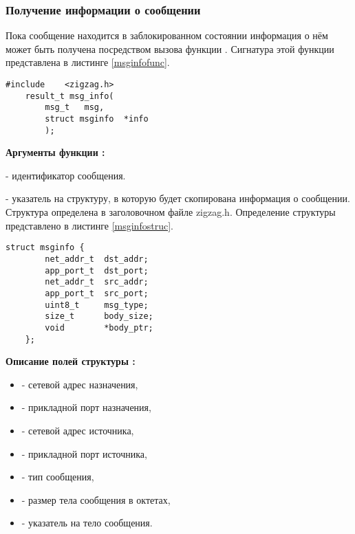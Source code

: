 \subsubsection{Получение информации о сообщении}

Пока сообщение находится в заблокированном состоянии информация о нём может быть получена посредством
вызова функции . Сигнатура этой функции представлена в листинге \ref{msginfofunc}.

\begin{lstlisting}[caption=Функция \myfunc{msg\_info()} - информация о сообщении, label=msginfofunc ]
    #include    <zigzag.h>
    result_t msg_info(
        msg_t   msg,  
        struct msginfo  *info
        );
\end{lstlisting}

{\bfseries Аргументы функции :}

\begin{enumerate}
{\itshape
\item {} - идентификатор сообщения.
\item {} - указатель на структуру, в которую будет скопирована информация о сообщении. Структура
определена в заголовочном файле zigzag.h. Определение структуры представлено в листинге \ref{msginfostruc}.
}

\begin{lstlisting}[caption=Определение структуры \myarg{msginfo}., label=msginfostruc ]
    struct msginfo {
        net_addr_t  dst_addr;
        app_port_t  dst_port;
        net_addr_t  src_addr;
        app_port_t  src_port;
        uint8_t     msg_type;
        size_t      body_size;
        void        *body_ptr;
    };
\end{lstlisting}

{\bfseries Описание полей структуры :}

{\itshape
\begin{itemize}
\item {} - сетевой адрес назначения,
\item {} - прикладной порт назначения,
\item {} - сетевой адрес источника,
\item {} - прикладной порт источника,
\item {} - тип сообщения,
\item {} - размер тела сообщения в октетах,
\item {} - указатель на тело сообщения.
\end{itemize}
}

\end{enumerate}


